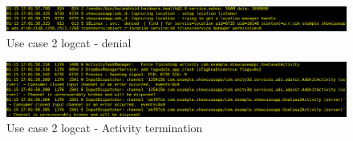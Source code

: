 \begin{figure}[h]
  \centering
  \includegraphics[width=\textwidth]{chapters/seapp/figs/ae/uc25.png}
  \caption{\label{fig:seapp_uc2_logcat1} Use case 2 logcat - \sel denial}  
\end{figure}      

\begin{figure}[h]
  \centering
  \includegraphics[width=\textwidth]{chapters/seapp/figs/ae/uc26.png}
  \caption{\label{fig:seapp_uc2_logcat2} Use case 2 logcat - Activity termination}  
\end{figure}      


